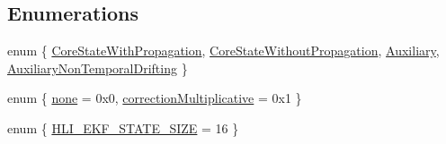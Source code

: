 \subsection*{Enumerations}
\begin{DoxyCompactItemize}
\item 
enum \{ \hyperlink{namespacemsf__core_a7250e8c11f743373771fc229011ae788a0c9bb148eede8a7954b42003c28db10b}{Core\-State\-With\-Propagation}, 
\hyperlink{namespacemsf__core_a7250e8c11f743373771fc229011ae788adeecad6ca6b649385e01284db731a939}{Core\-State\-Without\-Propagation}, 
\hyperlink{namespacemsf__core_a7250e8c11f743373771fc229011ae788a8c6eab374d267866f8dd37afe9f13598}{Auxiliary}, 
\hyperlink{namespacemsf__core_a7250e8c11f743373771fc229011ae788aa6011035f76e9b286df13b28730529f4}{Auxiliary\-Non\-Temporal\-Drifting}
 \}
\item 
enum \{ \hyperlink{namespacemsf__core_a5556ef5ed137371baee7e5781d6adf19ae4114cf2d14f44cd24e8ac5aef8b5278}{none} =  0x0, 
\hyperlink{namespacemsf__core_a5556ef5ed137371baee7e5781d6adf19ad901bb385d01dfd28356ca12451ac791}{correction\-Multiplicative} =  0x1
 \}
\item 
enum \{ \hyperlink{namespacemsf__core_a9aeda07a4bea09a1939516f18f299e16acb10c2fbf0037699227a1378aa886fe4}{H\-L\-I\-\_\-\-E\-K\-F\-\_\-\-S\-T\-A\-T\-E\-\_\-\-S\-I\-Z\-E} =  16
 \}
\end{DoxyCompactItemize}
